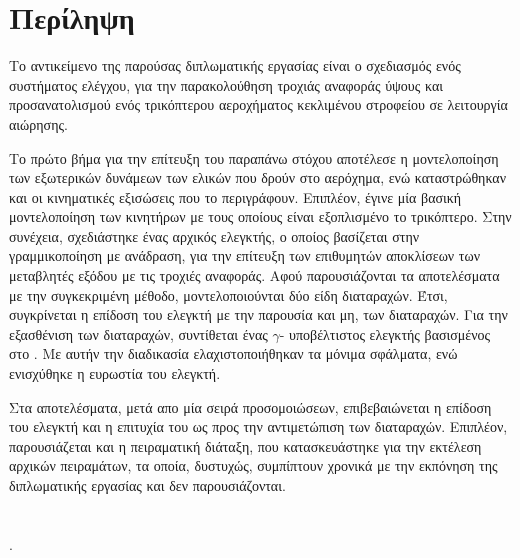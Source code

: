 
\chapter*{Περίληψη}
\noindent Το αντικείμενο της παρούσας διπλωματικής εργασίας είναι ο σχεδιασμός 
ενός συστήματος ελέγχου, για την παρακολούθηση τροχιάς αναφοράς ύψους και 
προσανατολισμού ενός τρικόπτερου αεροχήματος κεκλιμένου στροφείου σε λειτουργία 
αιώρησης.

Το πρώτο βήμα για την επίτευξη του παραπάνω στόχου αποτέλεσε η μοντελοποίηση 
των εξωτερικών δυνάμεων των ελικών που δρούν στο αερόχημα, ενώ καταστρώθηκαν και
οι κινηματικές εξισώσεις που το περιγράφουν. Επιπλέον, έγινε μία βασική 
μοντελοποίηση των κινητήρων με τους οποίους είναι εξοπλισμένο το 
τρικόπτερο. Στην συνέχεια, σχεδιάστηκε ένας αρχικός ελεγκτής, ο οποίος 
βασίζεται στην γραμμικοποίηση με ανάδραση, για την επίτευξη  των επιθυμητών 
αποκλίσεων των μεταβλητές εξόδου με τις τροχιές αναφοράς. Αφού παρουσιάζονται 
τα αποτελέσματα με την συγκεκριμένη μέθοδο, μοντελοποιούνται δύο είδη 
διαταραχών. Έτσι, συγκρίνεται η επίδοση του ελεγκτή με την παρουσία και μη, των 
διαταραχών. Για την εξασθένιση των διαταραχών, συντίθεται ένας $\gamma$-
υποβέλτιστος ελεγκτής βασισμένος στο . Με αυτήν την 
διαδικασία ελαχιστοποιήθηκαν τα μόνιμα σφάλματα, ενώ ενισχύθηκε η ευρωστία του 
ελεγκτή. 

Στα αποτελέσματα, μετά απο μία σειρά προσομοιώσεων, επιβεβαιώνεται η επίδοση του 
ελεγκτή και η επιτυχία του ως προς την αντιμετώπιση των διαταραχών. Επιπλέον, 
παρουσιάζεται και η πειραματική διάταξη, που κατασκευάστηκε για την εκτέλεση 
αρχικών πειραμάτων, τα οποία, δυστυχώς, συμπίπτουν χρονικά με την εκπόνηση της 
διπλωματικής εργασίας και δεν παρουσιάζονται.

\cleardoublepage


\chapter*{}

.

